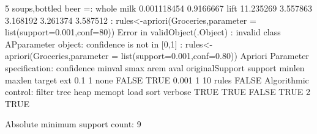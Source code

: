 \documentclass[10pt,a4paper]{article}
\begin{document}
{{5 {soups,bottled beer}    =: {whole milk}   0.001118454 0.9166667 
\newline
lift     
 11.235269
  3.557863
  3.168192
  3.261374
  3.587512
\newline
: rules<-apriori(Groceries,parameter = list(support=0.001,conf=80))
\newline
Error in validObject(.Object) : 
\newline
invalid class APparameter object: confidence is not in [0,1]
\newline
: rules<-apriori(Groceries,parameter = list(support=0.001,conf=0.80))
\newline
Apriori
}
Parameter specification:
\newline
confidence minval smax arem  aval originalSupport support minlen maxlen target   ext
    0.1    1 none FALSE            TRUE   0.001      1     10  rules FALSE
\newline
}
\newline
Algorithmic control:
\newline
filter tree heap memopt load sort verbose
 TRUE TRUE  FALSE TRUE    2    TRUE
\newline

Absolute minimum support count: 9 
\newline
\end{document}

